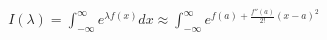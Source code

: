 \documentclass[preview]{standalone}
\begin{document}
\begin{align*}
I(\lambda) = \displaystyle \int_{-\infty}^{\infty} e^{\lambda f(x)} dx \approx \displaystyle \int_{-\infty}^{\infty} e^{f(a) + \frac{f''(a)}{2!}(x - a)^2}
\end{align*}
\end{document}
